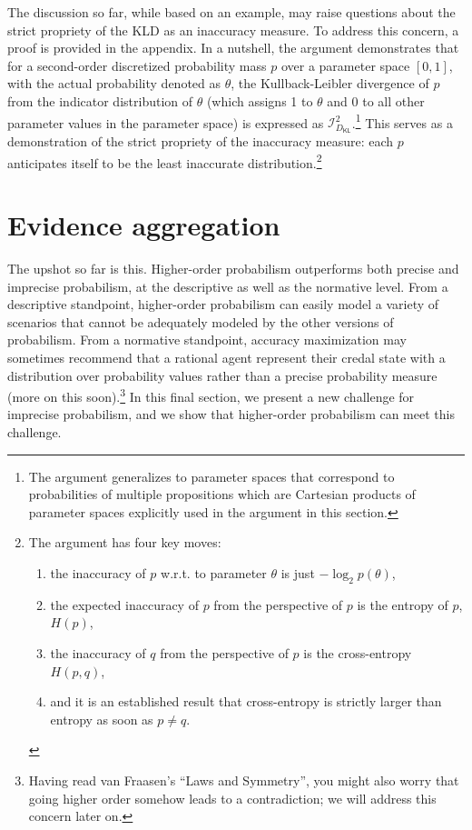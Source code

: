 \documentclass[
  letterpaper,
  DIV=11,
  numbers=noendperiod]{scrartcl}
\newcommand{\dkl}{D_{\mathsf{KL}}} %
\begin{document}
The discussion so far, while based on an example, may raise questions
about the strict propriety of the KLD as an inaccuracy measure. To
address this concern, a proof is provided in the appendix. In a
nutshell, the argument demonstrates that for a second-order discretized
probability mass \(p\) over a parameter space \([0,1]\), with the actual
probability denoted as \(\theta\), the Kullback-Leibler divergence of
\(p\) from the indicator distribution of \(\theta\) (which assigns 1 to
\(\theta\) and 0 to all other parameter values in the parameter space)
is expressed as \(\mathcal{I}_{\dkl}^2\).\footnote{The argument
  generalizes to parameter spaces that correspond to probabilities of
  multiple propositions which are Cartesian products of parameter spaces
  explicitly used in the argument in this section.} This serves as a
demonstration of the strict propriety of the inaccuracy measure: each
\(p\) anticipates itself to be the least inaccurate
distribution.\footnote{ The argument has four key moves:  

   
\begin{enumerate}
\item the inaccuracy of $p$ w.r.t. to parameter $\theta$ is just $- \log_2 p(\theta)$,
\item  the expected inaccuracy of $p$ from the perspective of $p$ is the entropy of $p$, $H(p)$,
\item  the inaccuracy of $q$ from the perspective of $p$ is the cross-entropy $H(p,q)$,
\item and it is an established result that cross-entropy is strictly larger than entropy as soon as $p\neq q$.
  \end{enumerate}
}

\hypertarget{evidence-aggregation}{%
\section{Evidence aggregation}\label{evidence-aggregation}}

The upshot so far is this. Higher-order probabilism outperforms both
precise and imprecise probabilism, at the descriptive as well as the
normative level. From a descriptive standpoint, higher-order probabilism
can easily model a variety of scenarios that cannot be adequately
modeled by the other versions of probabilism. From a normative
standpoint, accuracy maximization may sometimes recommend that a
rational agent represent their credal state with a distribution over
probability values rather than a precise probability
measure
(more on this soon).\footnote{Having read van Fraasen's ``Laws and
  Symmetry'', you might also worry that going higher order somehow leads
  to a contradiction; we will address this concern later on.}
In this final section, we present a new challenge for imprecise
probabilism, and we show that higher-order probabilism can meet this
challenge.
\end{document}
